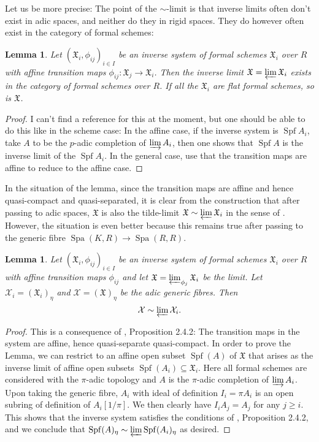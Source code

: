 \documentclass[11pt,oneside]{amsart}
\newtheorem{lemma}[theorem]{Lemma}
\theoremstyle{definition}
\theoremstyle{remark}
\begin{document}
	Let us be more precise: The point of the $\sim$-limit is that inverse limits often don't exist in adic spaces, and neither do they in rigid spaces. They do however often exist in the category of formal schemes:
	\begin{lemma}
		Let $(\mathfrak X_i,\phi_{ij})_{i\in I}$ be an inverse system of formal schemes $\mathfrak X_i$ over $R$ with affine transition maps $\phi_{ij}:\mathfrak X_j\rightarrow \mathfrak X_i$. Then the inverse limit $\mathfrak X=\varprojlim \mathfrak X_i$ exists in the category of formal schemes over $R$. If all the $\mathfrak X_i$ are flat formal schemes, so is $\mathfrak X$.
	\end{lemma}
	\begin{proof}
		I can't find a reference for this at the moment, but one should be able to do this like in the scheme case: In the affine case, if the inverse system is $\operatorname{Spf} A_i$, take $A$ to be the $p$-adic completion of $\varinjlim A_i$, then one shows that $\operatorname{Spf} A$ is the inverse limit of the $\operatorname{Spf}A_i$. In the general case, use that the transition maps are affine to reduce to the affine case.
	\end{proof}
	In the situation of the lemma, since the transition maps are affine and hence quasi-compact and quasi-separated, it is clear from the construction that after passing to adic spaces, $\mathfrak X$ is also the tilde-limit  $\mathfrak X\sim \varprojlim \mathfrak X_i$ in the sense of \cite{SW}. However, the situation is even better because this remains true after passing to the generic fibre $\operatorname{Spa}(K,R)\rightarrow \operatorname{Spa}(R,R)$.
	\begin{lemma}\label{tilde-limit from adic generic fibre of formal schemes}
		Let $(\mathfrak X_i,\phi_{ij})_{i\in I}$ be an inverse system of formal schemes $\mathfrak X_i$ over $R$ with affine transition maps $\phi_{ij}$ and let $\mathfrak X=\varprojlim_{\phi_j} \mathfrak X_i$ be the limit. Let $\mathcal X_i =(\mathfrak X_i)_\eta$ and  $\mathcal X = (\mathfrak X)_\eta$ be the adic generic fibres. Then
		\[\mathcal X \sim \varprojlim \mathcal X_i.\]
	\end{lemma}
	\begin{proof}
		This is a consequence of \cite{SW}, Proposition 2.4.2: The transition maps in the system are affine, hence quasi-separate quasi-compact. In order to prove the Lemma, we can restrict to an affine open subset $\operatorname{Spf}(A)$ of $\mathfrak X$ that arises as the inverse limit of affine open subsets $\operatorname{Spf}(A_i)\subseteq \mathfrak X_i$. Here all formal schemes are considered with the $\pi$-adic topology and $A$ is the $\pi$-adic completion of $\varinjlim A_i$. 
		Upon taking the generic fibre, $A_i$ with ideal of definition $I_i=\pi A_i$ is an open subring of definition of $A_i[1/\pi]$. We then clearly have $I_iA_j = A_j$ for any $j\geq i$. This shows that the inverse system satisfies the conditions of \cite{SW}, Proposition 2.4.2, and we conclude that $\operatorname{Spf}(A)_\eta \sim \varprojlim \operatorname{Spf}(A_i)_\eta$ as desired.
	\end{proof}
	
\end{document}
